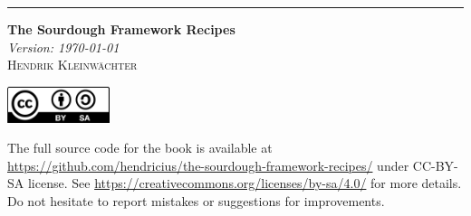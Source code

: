 \rule{1pt}{\textheight} %
\hspace{0.05\textwidth}
\parbox[b]{0.75\textwidth}{%
{\Huge\bfseries The Sourdough Framework Recipes}\\[2\baselineskip] %
{\large\textit{Version: \today}}\\[4\baselineskip]
{\Large\textsc{Hendrik Kleinwächter}} %

\vspace{0.5\textheight}


{\noindent
\begin{flushleft}
    \includegraphics[width=3cm]{cover/CC-BY-SA}\par
The full source code for the book is available at
\url{https://github.com/hendricius/the-sourdough-framework-recipes/} under CC-BY-SA
license.
See \url{https://creativecommons.org/licenses/by-sa/4.0/} for more details.
Do not hesitate to report mistakes or sug\-gestions for
improvements.
\end{flushleft}
}
}
